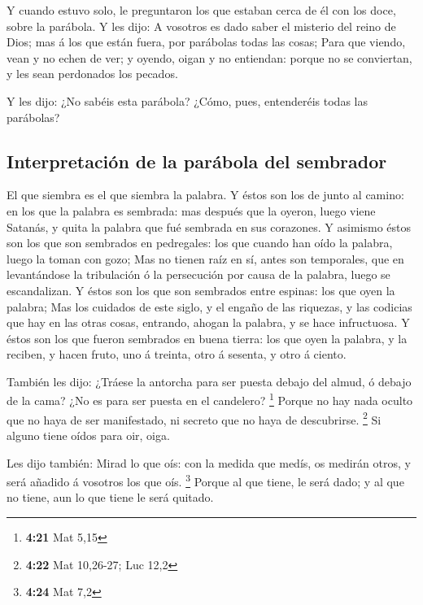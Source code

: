  Y cuando estuvo solo, le preguntaron los que estaban
cerca de él con los doce, sobre la parábola.  Y les dijo:
A vosotros es dado saber el misterio del reino de Dios; mas á los que
están fuera, por parábolas todas las cosas;  Para que
viendo, vean y no echen de ver; y oyendo, oigan y no entiendan: porque
no se conviertan, y les sean perdonados los pecados.

 Y les dijo: ¿No sabéis esta parábola? ¿Cómo, pues,
entenderéis todas las parábolas?

\hypertarget{interpretaciuxf3n-de-la-paruxe1bola-del-sembrador}{%
\subsection{Interpretación de la parábola del
sembrador}\label{interpretaciuxf3n-de-la-paruxe1bola-del-sembrador}}

 El que siembra es el que siembra la palabra.
 Y éstos son los de junto al camino: en los que la
palabra es sembrada: mas después que la oyeron, luego viene Satanás, y
quita la palabra que fué sembrada en sus corazones.  Y
asimismo éstos son los que son sembrados en pedregales: los que cuando
han oído la palabra, luego la toman con gozo;  Mas no
tienen raíz en sí, antes son temporales, que en levantándose la
tribulación ó la persecución por causa de la palabra, luego se
escandalizan.  Y éstos son los que son sembrados entre
espinas: los que oyen la palabra;  Mas los cuidados de
este siglo, y el engaño de las riquezas, y las codicias que hay en las
otras cosas, entrando, ahogan la palabra, y se hace infructuosa.
 Y éstos son los que fueron sembrados en buena tierra:
los que oyen la palabra, y la reciben, y hacen fruto, uno á treinta,
otro á sesenta, y otro á ciento.

 También les dijo: ¿Tráese la antorcha para ser puesta
debajo del almud, ó debajo de la cama? ¿No es para ser puesta en el
candelero? \footnote{\textbf{4:21} Mat 5,15}  Porque no
hay nada oculto que no haya de ser manifestado, ni secreto que no haya
de descubrirse. \footnote{\textbf{4:22} Mat 10,26-27; Luc 12,2}
 Si alguno tiene oídos para oir, oiga.

 Les dijo también: Mirad lo que oís: con la medida que
medís, os medirán otros, y será añadido á vosotros los que oís.
\footnote{\textbf{4:24} Mat 7,2}  Porque al que tiene, le
será dado; y al que no tiene, aun lo que tiene le será quitado.


